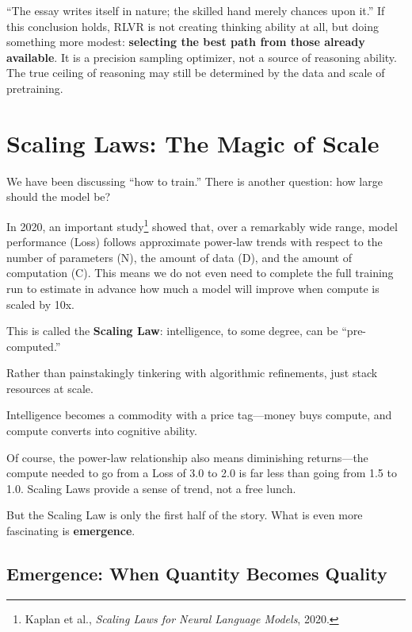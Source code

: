 ``The essay writes itself in nature; the skilled hand merely chances upon it.'' If this conclusion holds, RLVR is not creating thinking ability at all, but doing something more modest: \textbf{selecting the best path from those already available}. It is a precision sampling optimizer, not a source of reasoning ability. The true ceiling of reasoning may still be determined by the data and scale of pretraining.


\newpage
\section{Scaling Laws: The Magic of Scale}

We have been discussing ``how to train.'' There is another question: how large should the model be?

In 2020, an important study\footnote{Kaplan et al., \textit{Scaling Laws for Neural Language Models}, 2020.} showed that, over a remarkably wide range, model performance (Loss) follows approximate power-law trends with respect to the number of parameters (N), the amount of data (D), and the amount of computation (C). This means we do not even need to complete the full training run to estimate in advance how much a model will improve when compute is scaled by 10x.

\vspace{1em}

This is called the \textbf{Scaling Law}: intelligence, to some degree, can be ``pre-computed.''

Rather than painstakingly tinkering with algorithmic refinements, just stack resources at scale.

Intelligence becomes a commodity with a price tag---money buys compute, and compute converts into cognitive ability.

\vspace{1em}

Of course, the power-law relationship also means diminishing returns---the compute needed to go from a Loss of 3.0 to 2.0 is far less than going from 1.5 to 1.0. Scaling Laws provide a sense of trend, not a free lunch.

But the Scaling Law is only the first half of the story. What is even more fascinating is \textbf{emergence}.

\subsection{Emergence: When Quantity Becomes Quality}

